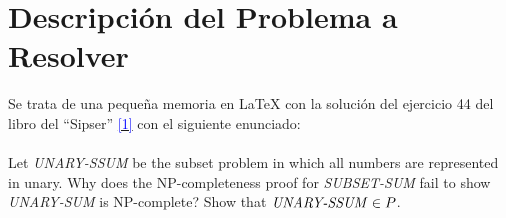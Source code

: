 \documentclass[../main]{subfiles}
\begin{document}
\chapter{Descripción del Problema a Resolver}

{
\hypersetup{linkcolor=black}
\minitoc

}


Se trata de una pequeña memoria en LaTeX con la solución del ejercicio 44 del libro del ``Sipser'' \hyperlink{target:zona}{\textcolor{blue}{[1]}} con el siguiente enunciado: \\ \\
Let \textit{UNARY-SSUM} be the subset problem in which all numbers are represented in unary. Why does the NP-completeness proof for \textit{SUBSET-SUM} fail to show \textit{UNARY-SUM} is NP-complete? Show that $\text{\textit{UNARY-SSUM}} \in P$.
\end{document}
